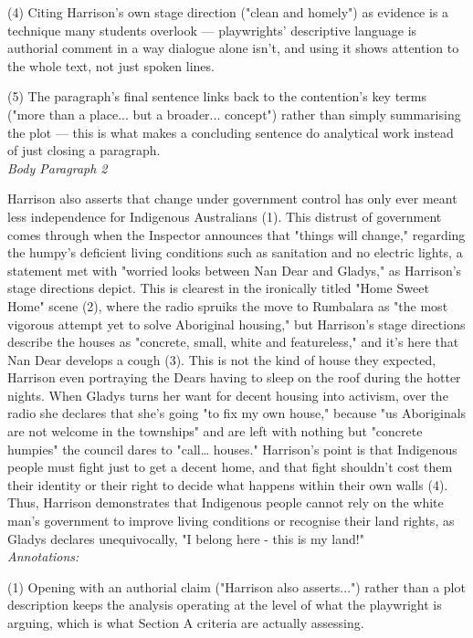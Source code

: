\documentclass[a4paper]{article}
\begin{document}
(4) Citing Harrison's own stage direction ("clean and homely") as evidence is a technique many students overlook — playwrights' descriptive language is authorial comment in a way dialogue alone isn't, and using it shows attention to the whole text, not just spoken lines.

(5) The paragraph's final sentence links back to the contention's key terms ("more than a place... but a broader... concept") rather than simply summarising the plot — this is what makes a concluding sentence do analytical work instead of just closing a paragraph.\\

\textit{Body Paragraph 2}

Harrison also asserts that change under government control has only ever meant less independence for Indigenous Australians (1). This distrust of government comes through when the Inspector announces that "things will change," regarding the humpy's deficient living conditions such as sanitation and no electric lights, a statement met with "worried looks between Nan Dear and Gladys," as Harrison's stage directions depict. This is clearest in the ironically titled "Home Sweet Home" scene (2), where the radio spruiks the move to Rumbalara as "the most vigorous attempt yet to solve Aboriginal housing," but Harrison's stage directions describe the houses as "concrete, small, white and featureless," and it's here that Nan Dear develops a cough (3). This is not the kind of house they expected, Harrison even portraying the Dears having to sleep on the roof during the hotter nights. When Gladys turns her want for decent housing into activism, over the radio she declares that she's going "to fix my own house," because "us Aboriginals are not welcome in the townships" and are left with nothing but "concrete humpies" the council dares to "call… houses." Harrison's point is that Indigenous people must fight just to get a decent home, and that fight shouldn't cost them their identity or their right to decide what happens within their own walls (4). Thus, Harrison demonstrates that Indigenous people cannot rely on the white man's government to improve living conditions or recognise their land rights, as Gladys declares unequivocally, "I belong here - this is my land!"\\

\textit{Annotations:}

(1) Opening with an authorial claim ("Harrison also asserts...") rather than a plot description keeps the analysis operating at the level of what the playwright is arguing, which is what Section A criteria are actually assessing.
\end{document}
